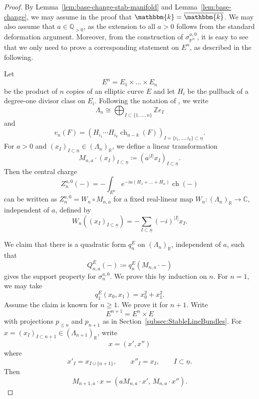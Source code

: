 \documentclass[11pt, reqno]{amsart}
\numberwithin{equation}{section}
\theoremstyle{plain}
\theoremstyle{remark}
\theoremstyle{definition}
\theoremstyle{italicsname}
\DeclareMathOperator{\ch}{{ch}}
\newcommand{\KK}{\mathbbm{k}}
\def\CC{\ensuremath{\mathbb{C}}}
\def\QQ{\ensuremath{\mathbb{Q}}}
\def\RR{\ensuremath{\mathbb{R}}}
\def\ZZ{\ensuremath{\mathbb{Z}}}
\def\PP{\ensuremath{\mathbb{P}}}
\begin{document}
\begin{proof}
By Lemma~\ref{lem:base-change-stab-manifold} and Lemma~\ref{lem:base-change}, we may assume in the proof that $\KK=\overline{\KK}$. 
We may also assume that $a\in \QQ_{>0}$, as the extension to all $a>0$ follows from the standard deformation argument. 
Moreover, from the construction of $\sigma_{\PP^n}^{a,0}$, it is easy to see that we only need to prove a corresponding statement on $E^n$, as described in the following.

Let
\[
E^n=E_1\times\dots\times E_n
\]
be the product of $n$ copies of an elliptic curve $E$ and let
$H_i$ be the pullback of a degree-one divisor class on $E_i$.
Following the notation of \cite[Section~4.2]{curves}, we write
\[
\Lambda_n\cong
\bigoplus_{I\subset\{1,\dots,n\}}\ZZ e_I
\]
and
\[
v_n(F)=
\left(H_{i_1}\cdots H_{i_k}\ch_{n-k}(F)\right)_
{I=\{i_1,\dots,i_k\}\subset\underline{n}}.
\]
For $a>0$ and $(x_I)_{I\subset \underline{n}}\in (\Lambda_n)_{\RR}$, we define a linear transformation
\[
M_{n,a}\cdot (x_I)_{I\subset \underline{n}}\coloneqq (a^{|I|}x_I)_{I\subset \underline{n}}.
\]
Then the central charge
\[
Z_n^{a,0}(-)=-\int_{E^n}e^{-ia(H_1+\dots+H_n)}\ch(-)
\]
can be written as $Z_n^{a,0}=W_n\circ M_{n,a}$ for a fixed real-linear map $W_n\colon(\Lambda_n)_\RR\to\CC$, independent of $a$, defined by
\[
W_n((x_I)_{I\subset \underline{n}})=-\sum_{I\subset\underline n}(-i)^{|I|}x_I.
\]

We claim that there is a quadratic form $q^E_n$ on $(\Lambda_n)_{\RR}$,
independent of $a$, such that
\[
Q^E_{n,a}(-)\coloneqq q^E_n(M_{n,a}\cdot -)
\]
gives the support property for $\sigma_n^{a,0}$.
We prove this by induction on $n$. 
For $n=1$, we may take
\[
q^E_1(x_0,x_1)=x_0^2+x_1^2.
\]
Assume the claim is known for $n\geq1$. 
We prove it for $n+1$. 
Write
\[
E^{n+1}=E^n\times E
\]
with projections $p_{\leq n}$ and $p_{n+1}$ as in Section~\ref{subsec:StableLineBundles}. 
For $x=(x_I)_{I\subset\underline{n+1}}\in(\Lambda_{n+1})_{\RR}$, write
\[
x=(x',x'')
\]
where
\[
x'_I=x_{I\cup\{n+1\}},
\qquad
x''_I=x_I,
\qquad I\subset\underline{n}.
\]
Then
\[
M_{n+1,a}\cdot x=(aM_{n,a}\cdot x',\,M_{n,a}\cdot x'').
\]


\end{proof}
\end{document}
